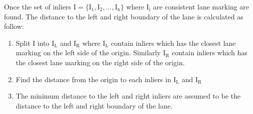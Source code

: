 Once the set of inliers $\mathrm{I} =\{\mathrm{I_{1}}, \mathrm{I_{2}}, . . 
., \mathrm{I_{n}}\}$ where $\mathrm{I_{i}}$ are consistent lane 
marking are found. The distance to the left and right boundary of the lane is 
calculated as follow: 
\begin{enumerate}
  \item Split $\mathrm{I}$ into $\mathrm{I_{L}}$ and $\mathrm{I_{R}}$ where $\mathrm{I_{L}}$ contain inliers which has the closest lane marking on the left side of the origin. Similarly $\mathrm{I_{R}}$ contain inliers which has the closest lane marking on the right side of the origin.
  \item Find the distance from the origin to each inliers in $\mathrm{I_{L}}$ and $\mathrm{I_{R}}$
  \item The  minimum distance to the left and right inliers are assumed to be the distance to the left and right boundary of the lane. 
\end{enumerate}
